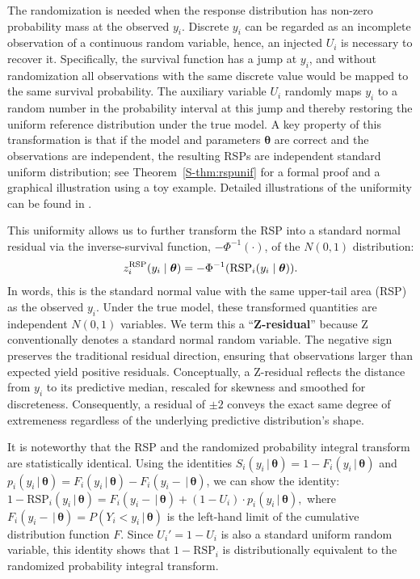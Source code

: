 The randomization is  needed when the response distribution has non-zero probability mass at the observed $y_i$.  Discrete $y_i$ can be regarded as an incomplete observation of a continuous random variable, hence, an injected $U_i$ is necessary to recover it. Specifically, the survival function has a jump at \(y_i\), and without randomization all observations with the same discrete value would be mapped to the same survival probability. The auxiliary variable \(U_i\) randomly maps $y_i$ to a random number in the probability interval at this jump and thereby restoring the uniform reference distribution under the true model. A key property of this transformation is that if the model and parameters $\bm{\theta}$ are correct and the observations are independent, the resulting RSPs are independent standard uniform distribution; see Theorem~\ref{S-thm:rspunif} for a formal proof and a graphical illustration using a toy example. Detailed illustrations of the uniformity can  be found in \citet{Dunn1996, FengCindy2020Acor}. 

This uniformity allows us to further transform the RSP into a standard normal residual via the inverse-survival function, $-\Phi^{-1}(\cdot)$, of the $N(0,1)$ distribution:
\begin{equation}\label{eq:z_residual_definition}
z_i^{\text{RSP}} (y_i \mid \bm{\theta}) = -\Phi^{-1}(\text{RSP}_i(y_i \mid \bm{\theta})).
\end{equation}
In words, this is the standard normal value with the same upper-tail area (RSP) as the observed $y_i$. Under the true model, these transformed quantities are independent $N(0,1)$ variables. We term this a ``\textbf{Z-residual}'' because Z conventionally denotes a standard normal random variable. The negative sign preserves the traditional residual direction, ensuring that observations larger than expected yield positive residuals. Conceptually, a Z-residual reflects the distance from $y_i$ to its predictive median, rescaled for skewness and smoothed for discreteness. Consequently, a residual of $\pm 2$ conveys the exact same degree of extremeness regardless of the underlying predictive distribution's shape.




It is noteworthy that the RSP and the randomized probability integral transform \citep{smith1985diagnostic} are statistically identical. Using the identities $S_i(y_i\,|\, \bm{\theta}) = 1-F_i(y_i\,|\, \bm{\theta})$ and $p_i(y_i\,|\, \bm{\theta}) = F_i(y_i\,|\, \bm{\theta}) - F_i(y_i-\,|\, \bm{\theta})$, we can show the identity:
$1 - \text{RSP}_i(y_i\,|\, \bm{\theta}) = F_i(y_i-\,|\, \bm{\theta}) + (1-U_i) \cdot p_i(y_i\,|\, \bm{\theta}),$
where $F_i(y_i-\,|\, \bm{\theta}) = P(Y_i < y_i \,|\, \bm{\theta})$ is the left-hand limit of the cumulative distribution function $F$. Since $U_i' = 1-U_i$ is also a standard uniform random variable, this identity shows that $1 - \text{RSP}_i$ is distributionally equivalent to the randomized probability integral transform. 

